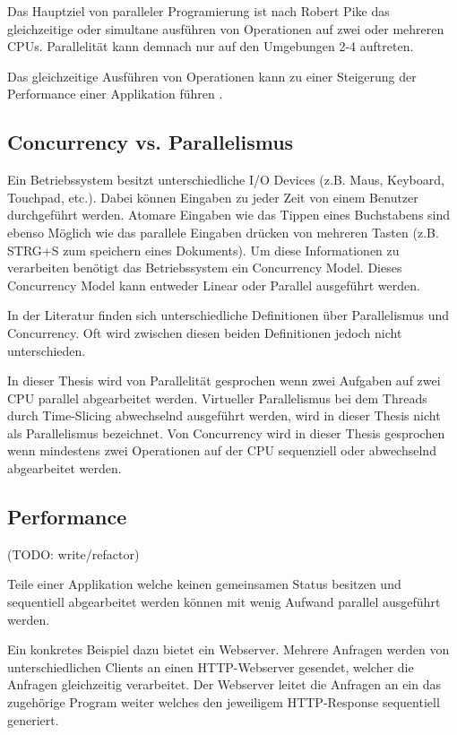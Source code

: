 Das Hauptziel von paralleler Programierung ist nach Robert Pike das gleichzeitige oder simultane ausführen von Operationen auf zwei oder mehreren CPUs.\cite[]{Pik2013} Parallelität kann demnach nur auf den Umgebungen 2-4 auftreten.

Das gleichzeitige Ausführen von Operationen kann zu einer Steigerung der Performance einer Applikation führen \cite[p. 18]{Can08}.

\subsection{Concurrency vs. Parallelismus}

Ein Betriebssystem besitzt unterschiedliche I/O Devices (z.B. Maus, Keyboard, Touchpad, etc.). Dabei können Eingaben zu jeder Zeit von einem Benutzer durchgeführt werden. Atomare Eingaben wie das Tippen eines Buchstabens sind ebenso Möglich wie das parallele Eingaben drücken von mehreren Tasten (z.B. STRG+S zum speichern eines Dokuments). Um diese Informationen zu verarbeiten benötigt das Betriebssystem ein Concurrency Model. Dieses Concurrency Model kann entweder Linear oder Parallel ausgeführt werden. \cite[]{Pik2013}

In der Literatur finden sich unterschiedliche Definitionen über Parallelismus und Concurrency. Oft wird zwischen diesen beiden Definitionen jedoch nicht unterschieden.

In dieser Thesis wird von Parallelität gesprochen wenn zwei Aufgaben auf zwei CPU parallel abgearbeitet werden. Virtueller Parallelismus bei dem Threads durch Time-Slicing abwechselnd ausgeführt werden, wird in dieser Thesis nicht als Parallelismus bezeichnet. Von Concurrency wird in dieser Thesis gesprochen wenn mindestens zwei Operationen auf der CPU sequenziell oder abwechselnd abgearbeitet werden.


\subsection{Performance}
(TODO: write/refactor)

Teile einer Applikation welche keinen gemeinsamen Status besitzen und sequentiell abgearbeitet werden können mit wenig Aufwand parallel ausgeführt werden. \cite[p. 18]{Can08}

Ein konkretes Beispiel dazu bietet ein Webserver. Mehrere Anfragen werden von unterschiedlichen Clients an einen HTTP-Webserver gesendet, welcher die Anfragen gleichzeitig verarbeitet. Der Webserver leitet die Anfragen an ein das zugehörige Program weiter welches den jeweiligem HTTP-Response sequentiell generiert. \cite[p. 18]{Can08}

